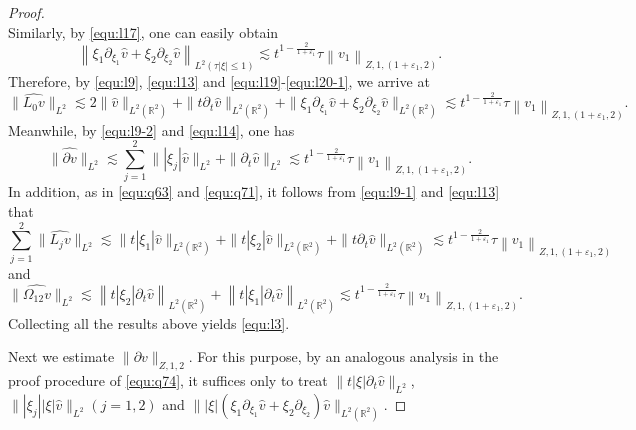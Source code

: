 \documentclass[11pt,twoside]{article}
\newcommand{\R}{\mathbb R}
\newcommand{\p}{\partial}
\theoremstyle{plain}
\theoremstyle{definition}
\theoremstyle{remark}
\numberwithin{equation}{section}
\begin{document}
\begin{proof}
\begin{equation}
\end{equation}
Similarly, by \eqref{equ:l17}, one can easily obtain
\begin{equation}\label{equ:l20-1}
\left\|\xi_1\p_{\xi_1}\hat{v}+\xi_2\p_{\xi_2}\hat{v}\right\|_{L^2(\tau|\xi|\leq1)}
\lesssim t^{1-\frac{2}{1+\varepsilon_1}} \tau\left\|v_1\right\|_{Z, 1, \left(1+\varepsilon_1, 2\right)}.
\end{equation}
Therefore, by \eqref{equ:l9}, \eqref{equ:l13} and \eqref{equ:l19}-\eqref{equ:l20-1}, we arrive at
$$
\|\widehat{L_0v}\|_{L^2}\lesssim 2\|\hat{v}\|_{L^2(\R^2)}+\|t\p_t\hat{v}\|_{L^2(\R^2)}+\|\xi_1\p_{\xi_1}\hat{v}+\xi_2\p_{\xi_2}\hat{v}\|_{L^2(\R^2)}\lesssim t^{1-\frac{2}{1+\varepsilon_1}} \tau\left\|v_1\right\|_{Z, 1, \left(1+\varepsilon_1, 2\right)}.
$$
Meanwhile, by \eqref{equ:l9-2} and \eqref{equ:l14}, one has
$$
\|\widehat{\p v}\|_{L^2}\lesssim \sum_{j=1}^2\||\xi_j|\hat{v}\|_{L^2}+\|\p_t\hat{v}\|_{L^2}\lesssim t^{1-\frac{2}{1+\varepsilon_1}} \tau\left\|v_1\right\|_{Z, 1, \left(1+\varepsilon_1, 2\right)}.
$$
In addition, as in \eqref{equ:q63} and \eqref{equ:q71}, it follows from \eqref{equ:l9-1} and \eqref{equ:l13} that
$$
\sum_{j=1}^2\|\widehat{L_jv}\|_{L^2}\lesssim \|t|\xi_1|\hat{v}\|_{L^2(\R^2)}+\|t|\xi_2|\hat{v}\|_{L^2(\R^2)}+\|t\p_t\hat{v}\|_{L^2(\R^2)}\lesssim t^{1-\frac{2}{1+\varepsilon_1}} \tau\left\|v_1\right\|_{Z, 1, \left(1+\varepsilon_1, 2\right)}
$$
and
$$
\|\widehat{\Omega_{12}v}\|_{L^2}\lesssim \left\|t|\xi_2|\p_t\hat{v}\right\|_{L^2(\R^2)}+\left\|t|\xi_1|\p_t\hat{v}\right\|_{L^2(\R^2)}\lesssim t^{1-\frac{2}{1+\varepsilon_1}} \tau\left\|v_1\right\|_{Z, 1, \left(1+\varepsilon_1, 2\right)}.
$$
Collecting all the results above yields \eqref{equ:l3}.


Next we estimate  $\|\p v\|_{Z, 1, 2}$. For this purpose, by an analogous analysis in the proof procedure
of \eqref{equ:q74}, it suffices only to treat $\|t|\xi|\p_t\hat{v}\|_{L^2}$, $\||\xi_j||\xi|\hat{v}\|_{L^2}(j=1, 2)$ and $\||\xi|(\xi_1\p_{\xi_1}\hat{v}+\xi_2\p_{\xi_2})\hat{v}\|_{L^2(\R^2)}$.


\end{proof}
\end{document}
